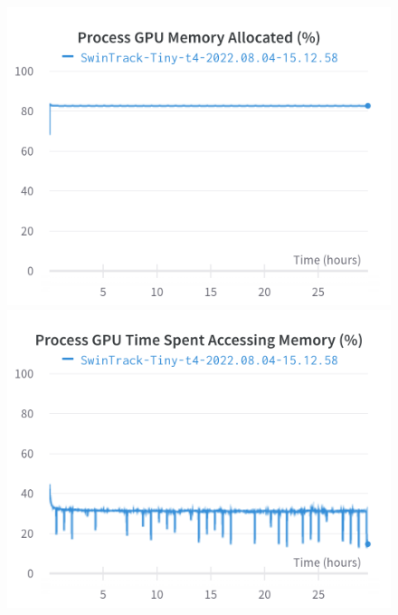 \documentclass{article}
\begin{document}
\begin{figure}[h]
\includegraphics[width=\linewidth]{charts/Section-4-Panel-2-sqs13f831}
\caption{}
\endminipage\hfill
{}
\includegraphics[width=\linewidth]{charts/Section-4-Panel-3-bkwac6ech}
\caption{}
\endminipage
\end{figure}
\end{document}
